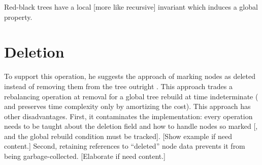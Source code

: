 \documentclass[preprint]{sigplanconf}
\begin{document}
Red-black trees have a local [more like recursive] invariant which induces a global property.

\section{Deletion}

To support this operation, he suggests the approach of marking nodes as deleted instead of removing them from the tree outright \cite[p. 50]{okasaki1996purely}. This approach trades a rebalancing operation at removal for a global tree rebuild at time indeterminate ( and preserves time complexity only by amortizing the cost). This approach has other disadvantages. First, it contaminates the implementation: every operation needs to be taught about the deletion field and how to handle nodes so marked [, and the global rebuild condition must be tracked]. [Show example if need content.] Second, retaining references to ``deleted'' node data prevents it from being garbage-collected. [Elaborate if need content.]
\end{document}
